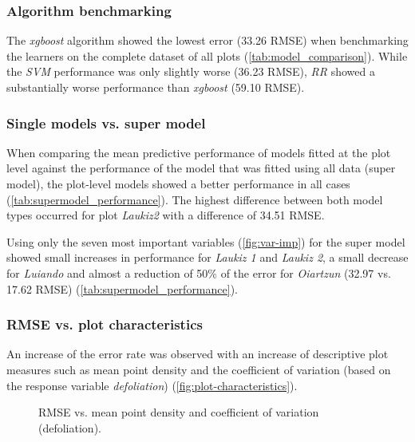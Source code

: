 \documentclass[review]{elsarticle}
\begin{document}
\subsubsection{Algorithm benchmarking}

\noindent The \textit{xgboost} algorithm showed the lowest error (33.26 RMSE) when benchmarking the learners on the complete dataset of all plots (\autoref{tab:model_comparison}).
While the \textit{SVM} performance was only slightly worse (36.23 RMSE), \textit{RR} showed a substantially worse performance than \textit{xgboost} (59.10 RMSE).

\subsubsection{Single models vs. super model}

\noindent When comparing the mean predictive performance of models fitted at the plot level against the performance of the model that was fitted using all data (super model), the plot-level models showed a better performance in all cases (\autoref{tab:supermodel_performance}).
The highest difference between both model types occurred for plot \textit{Laukiz2} with a difference of 34.51 RMSE.

Using only the seven most important variables (\autoref{fig:var-imp}) for the super model showed small increases in performance for \textit{Laukiz 1} and \textit{Laukiz 2}, a small decrease for \textit{Luiando} and almost a reduction of 50\% of the error for \textit{Oiartzun} (32.97 vs. 17.62 RMSE) (\autoref{tab:supermodel_performance}).

\subsubsection{RMSE vs. plot characteristics}

\noindent An increase of the error rate was observed with an increase of descriptive plot measures such as mean point density and the coefficient of variation (based on the response variable \textit{defoliation}) (\autoref{fig:plot-characteristics}).

\begin{figure} [t!]
	\begin{center}
		\caption{RMSE vs. mean point density and coefficient of variation (defoliation).}
		\label{fig:plot-characteristics}
	\end{center}
\end{figure}
\end{document}
